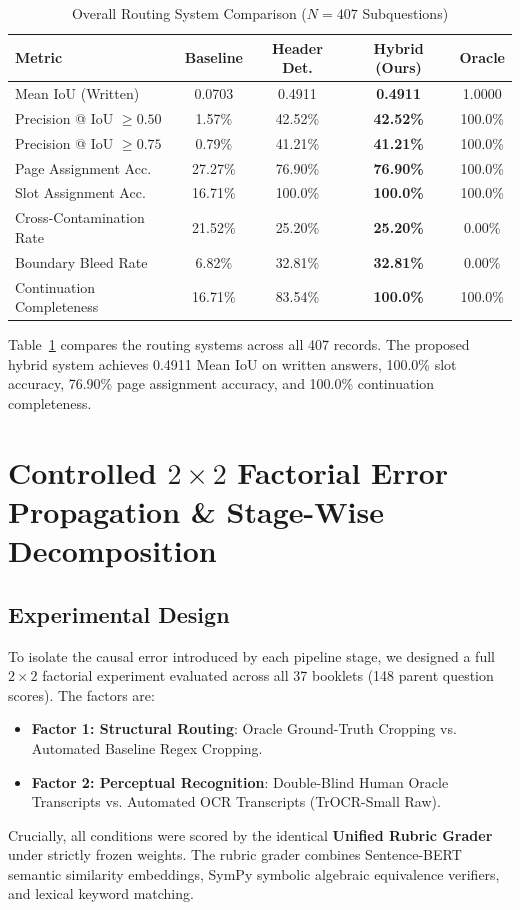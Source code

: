 \documentclass[journal]{IEEEtran}
\begin{document}
\begin{table}[t]
\centering
\caption{Overall Routing System Comparison ($N = 407$ Subquestions)}
\label{tab:routing_comparison}
\begin{tabular}{lcccc}
\toprule
\textbf{Metric} & \textbf{Baseline} & \textbf{Header Det.} & \textbf{Hybrid (Ours)} & \textbf{Oracle} \\
\midrule
Mean IoU (Written) & 0.0703 & 0.4911 & \textbf{0.4911} & 1.0000 \\
Precision @ IoU $\ge 0.50$ & 1.57\% & 42.52\% & \textbf{42.52\%} & 100.0\% \\
Precision @ IoU $\ge 0.75$ & 0.79\% & 41.21\% & \textbf{41.21\%} & 100.0\% \\
Page Assignment Acc. & 27.27\% & 76.90\% & \textbf{76.90\%} & 100.0\% \\
Slot Assignment Acc. & 16.71\% & 100.0\% & \textbf{100.0\%} & 100.0\% \\
Cross-Contamination Rate & 21.52\% & 25.20\% & \textbf{25.20\%} & 0.00\% \\
Boundary Bleed Rate & 6.82\% & 32.81\% & \textbf{32.81\%} & 0.00\% \\
Continuation Completeness & 16.71\% & 83.54\% & \textbf{100.0\%} & 100.0\% \\
\bottomrule
\end{tabular}
\end{table}

Table~\ref{tab:routing_comparison} compares the routing systems across all 407 records. The proposed hybrid system achieves 0.4911 Mean IoU on written answers, 100.0\% slot accuracy, 76.90\% page assignment accuracy, and 100.0\% continuation completeness.

\section{Controlled $2 \times 2$ Factorial Error Propagation \& Stage-Wise Decomposition}

\subsection{Experimental Design}
To isolate the causal error introduced by each pipeline stage, we designed a full $2 \times 2$ factorial experiment evaluated across all 37 booklets (148 parent question scores). The factors are:
\begin{itemize}
    \item \textbf{Factor 1: Structural Routing}: Oracle Ground-Truth Cropping vs. Automated Baseline Regex Cropping.
    \item \textbf{Factor 2: Perceptual Recognition}: Double-Blind Human Oracle Transcripts vs. Automated OCR Transcripts (TrOCR-Small Raw).
\end{itemize}
Crucially, all conditions were scored by the identical \textbf{Unified Rubric Grader} under strictly frozen weights. The rubric grader combines Sentence-BERT semantic similarity embeddings, SymPy symbolic algebraic equivalence verifiers, and lexical keyword matching.
\end{document}
